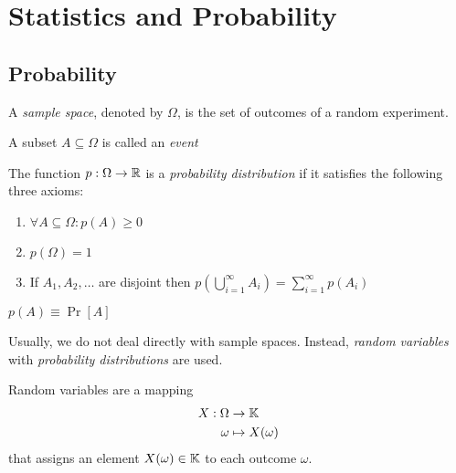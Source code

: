 \chapter{Statistics and Probability}



\section{Probability}

\begin{definition}
A \textit{sample space}, denoted by \(\Omega\), is the set of outcomes of a random experiment.
\end{definition}

\begin{definition}[Events]
A subset \(A \subseteq \Omega\) is called an \textit{event}
\end{definition}

\begin{definition}
The function \(p: \Omega \to \mathbb{R}\) is a \textit{probability distribution} if it satisfies the following three axioms:
\begin{enumerate}
\item \(\forall A \subseteq \Omega: p(A) \geq 0\)
\item \(p(\Omega) = 1\)
\item If \(A_1, A_2, \ldots\) are disjoint then \(p(\bigcup_{i=1}^\infty A_i) = \sum_{i=1}^\infty p(A_i)\)
\end{enumerate}
\end{definition}

\begin{notation}
\(p(A) \equiv \operatorname{Pr}[A]\)
\end{notation}

Usually, we do not deal directly with sample spaces. Instead, \textit{random variables} with \textit{probability distributions} are used.

\begin{definition}
Random variables are a mapping \begin{align*}
X: \Omega &\to \mathbb{K}\\
\omega &\mapsto X(\omega)
\end{align*}
that assigns an element \(X(\omega) \in \mathbb{K}\) to each outcome \(\omega\).
\end{definition}

